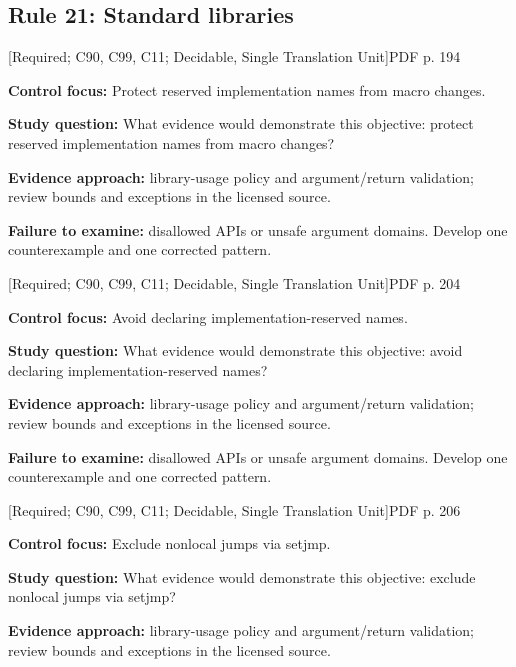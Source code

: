 \documentclass[10pt,letterpaper]{article}
\begin{document}
\subsection{Rule 21: Standard libraries}
 \textsf{\footnotesize [Required; C90, C99, C11; Decidable, Single Translation Unit]}\hfill{\footnotesize PDF p. 194}\par
\textbf{Control focus:} Protect reserved implementation names from macro changes.\par
\textbf{Study question:} What evidence would demonstrate this objective: protect reserved implementation names from macro changes?\par
\textbf{Evidence approach:} library-usage policy and argument/return validation; review bounds and exceptions in the licensed source.\par
\textbf{Failure to examine:} disallowed APIs or unsafe argument domains. Develop one counterexample and one corrected pattern.\par
\smallskip
{}
 \textsf{\footnotesize [Required; C90, C99, C11; Decidable, Single Translation Unit]}\hfill{\footnotesize PDF p. 204}\par
\textbf{Control focus:} Avoid declaring implementation-reserved names.\par
\textbf{Study question:} What evidence would demonstrate this objective: avoid declaring implementation-reserved names?\par
\textbf{Evidence approach:} library-usage policy and argument/return validation; review bounds and exceptions in the licensed source.\par
\textbf{Failure to examine:} disallowed APIs or unsafe argument domains. Develop one counterexample and one corrected pattern.\par
\smallskip
{}
 \textsf{\footnotesize [Required; C90, C99, C11; Decidable, Single Translation Unit]}\hfill{\footnotesize PDF p. 206}\par
\textbf{Control focus:} Exclude nonlocal jumps via setjmp.\par
\textbf{Study question:} What evidence would demonstrate this objective: exclude nonlocal jumps via setjmp?\par
\textbf{Evidence approach:} library-usage policy and argument/return validation; review bounds and exceptions in the licensed source.\par
\end{document}
